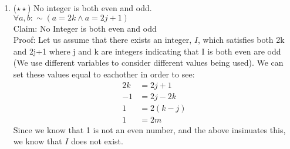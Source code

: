 \documentclass{letter}
\theoremstyle{definition}
\begin{document}
\begin{description}
\begin{enumerate}
		\item ($\star \star$) No integer is both even and odd. \\
$\forall a, b: \sim (a=2k \wedge a=2j+1)$ \\
Claim: No Integer is both even and odd \\
Proof: Let us assume that there exists an integer, $I$, which satisfies both 2k and 2j+1 where j and k are integers indicating that I is both even are odd (We use different variables to consider different values being used). We can set these values equal to eachother in order to see:\\
\begin{align*}
2k &= 2j+1 \\
-1 &= 2j-2k \tag{subtracts 2k and -1 from both sides}\\
1 &= 2(k-j)\tag{multiplies -1 by both sides and factors out 2 from 2j-2k}\\
1 &= 2m \tag{Represents k-j as m}
\end{align*}
Since we know that 1 is not an even number, and the above insinuates this, we know that $I$ does not exist. \\


\end{enumerate}
\end{description}
\end{document}
